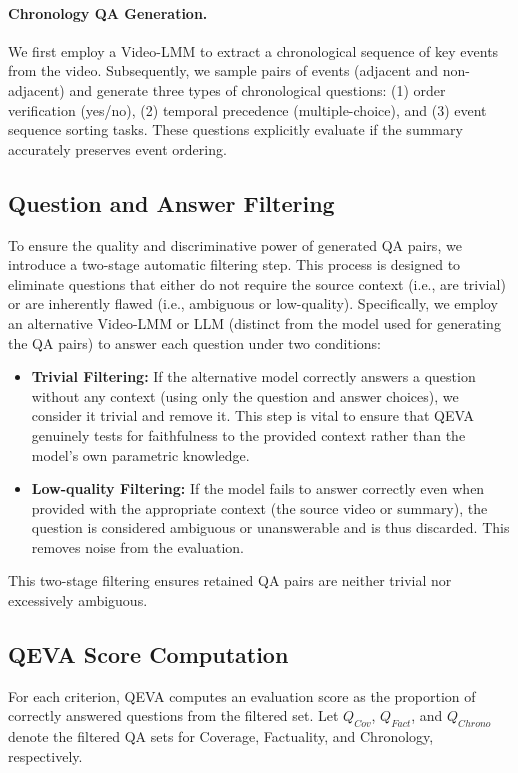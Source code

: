 \paragraph{Chronology QA Generation.}
We first employ a Video-LMM to extract a chronological sequence of key events from the video. Subsequently, we sample pairs of events (adjacent and non-adjacent) and generate three types of chronological questions: (1) order verification (yes/no), (2) temporal precedence (multiple-choice), and (3) event sequence sorting tasks. These questions explicitly evaluate if the summary accurately preserves event ordering.

\subsection{Question and Answer Filtering}
To ensure the quality and discriminative power of generated QA pairs, we introduce a two-stage automatic filtering step. This process is designed to eliminate questions that either do not require the source context (i.e., are trivial) or are inherently flawed (i.e., ambiguous or low-quality). Specifically, we employ an alternative Video-LMM or LLM (distinct from the model used for generating the QA pairs) to answer each question under two conditions:

\begin{itemize}
    \item \textbf{Trivial Filtering:} If the alternative model correctly answers a question without any context (using only the question and answer choices), we consider it trivial and remove it. This step is vital to ensure that QEVA genuinely tests for faithfulness to the provided context rather than the model's own parametric knowledge.
    \item \textbf{Low-quality Filtering:} If the model fails to answer correctly even when provided with the appropriate context (the source video or summary), the question is considered ambiguous or unanswerable and is thus discarded. This removes noise from the evaluation.
\end{itemize}

This two-stage filtering ensures retained QA pairs are neither trivial nor excessively ambiguous.

\subsection{QEVA Score Computation}
For each criterion, QEVA computes an evaluation score as the proportion of correctly answered questions from the filtered set. Let \(Q_{Cov}\), \(Q_{Fact}\), and \(Q_{Chrono}\) denote the filtered QA sets for Coverage, Factuality, and Chronology, respectively.

